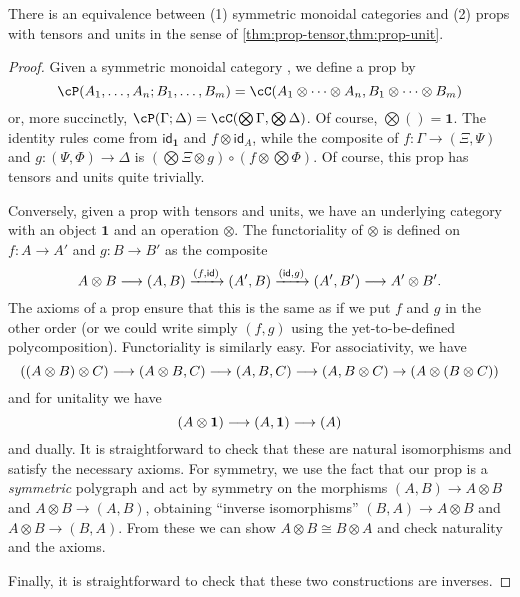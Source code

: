 \documentclass{book}
\def\idfunc{\mathsf{id}}
\def\unit{\mathbf{1}}
\def\one{\mathbf{1}}
\let\tensor\otimes
\let\bigtensor\bigotimes
\begin{document}
\begin{thm}\label{thm:prop-smc}
  There is an equivalence between (1) symmetric monoidal categories and (2) props with tensors and units in the sense of \cref{thm:prop-tensor,thm:prop-unit}.
\end{thm}
\begin{proof}
  Given a symmetric monoidal category \cC, we define a prop \cP by
  \[ \cP(A_1,\dots,A_n ; B_1,\dots,B_m) = \cC(A_1\tensor \cdots\tensor A_n, B_1\tensor\cdots\tensor B_m)\]
  or, more succinctly, $\cP(\Gamma;\Delta) = \cC(\bigtensor\Gamma, \bigtensor\Delta)$.
  Of course, $\bigtensor() = \one$.
  The identity rules come from $\idfunc_\one$ and $f\tensor \idfunc_A$, while the composite of $f:\Gamma\to (\Xi,\Psi)$ and $g:(\Psi,\Phi)\to \Delta$ is $(\bigtensor\Xi \tensor g) \circ (f\tensor \bigtensor \Phi)$.
  Of course, this prop has tensors and units quite trivially.

  Conversely, given a prop with tensors and units, we have an underlying category with an object $\one$ and an operation $\tensor$.
  The functoriality of $\tensor$ is defined on $f:A\to A'$ and $g:B\to B'$ as the composite
  \[ A\tensor B \too (A,B) \xto{(f,\idfunc)} (A',B) \xto{(\idfunc,g)} (A',B') \too A'\tensor B'. \]
  The axioms of a prop ensure that this is the same as if we put $f$ and $g$ in the other order (or we could write simply $(f,g)$ using the yet-to-be-defined polycomposition).
  Functoriality is similarly easy.
  For associativity, we have
  \[ ((A\tensor B)\tensor C) \too (A\tensor B,C) \too (A,B,C) \too (A,B\tensor C) \to (A\tensor (B\tensor C)) \]
  and for unitality we have
  \[ (A\tensor \unit) \too (A,\unit) \too (A) \]
  and dually.
  It is straightforward to check that these are natural isomorphisms and satisfy the necessary axioms.
  For symmetry, we use the fact that our prop is a \emph{symmetric} polygraph and act by symmetry on the morphisms $(A,B)\to A\tensor B$ and $A\tensor B\to (A,B)$, obtaining ``inverse isomorphisms'' $(B,A) \to A\tensor B$ and $A\tensor B \to (B,A)$.
  From these we can show $A\tensor B \cong B\tensor A$ and check naturality and the axioms.

  Finally, it is straightforward to check that these two constructions are inverses.
\end{proof}
\end{document}

